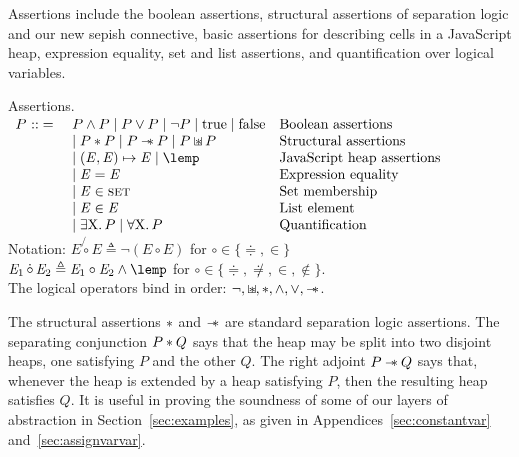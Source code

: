 \documentclass{article}
\newcommand{\iflong}[1]{#1}
\newcommand{\ifshort}[1]{}
\begin{document}
Assertions include the  boolean assertions, structural assertions of separation logic and our new
sepish connective, basic  assertions for describing cells in a JavaScript heap,  expression equality, set and list assertions, and quantification over logical variables.
%
\begin{display}{Assertions.}
$\begin{array}{rll}
  P \defeq 
 & P \land P \pipe P \lor P \pipe \neg P \pipe \true \pipe \false & \text{Boolean assertions}\\
 & \pipe P \sep P \pipe P \wand P \pipe P \sepish P %
                         & \text{Structural assertions} \\
 & \pipe (\Expr,\Expr)\pointsto \Expr \pipe \lemp %
                         & \text{JavaScript heap assertions} \\
 & \pipe \Expr\doteqdot\Expr & \text{Expression equality} \\ %
 & \pipe \Expr \in \T{set} & \text{Set membership} \\
 & \pipe \Expr \elem \Expr  & \text{List element} \\
 & \pipe \exists\V{X}\st P  \pipe \forall\V{X}\st P &  \text{Quantification} \\
\end{array}\Gap$\\[\gap]
Notation: $E\not{\!\circ} E \triangleq \neg(E \circ E)$  for ${\circ}\in\{\doteqdot,\in\}$\\
\phantom{Notation: }$\Expr_1 \dot{\,\circ\,}\Expr_2 \triangleq \Expr_1
\circ \Expr_2 \land \lemp$ for
${\circ}\in\{\doteqdot,\not\doteqdot,\in,\notin\}$.\\
The logical operators bind in order: $\neg,\mathbin{\sqcup\mkern-10mu*},\mathbin{*},\land,\lor,\mathbin{-\mkern-6mu *}$.
\end{display}
%
The structural assertions $\mathbin{*}$ and $\mathbin{-\mkern-6mu *}$ are
standard separation logic assertions. The separating conjunction
$P\mathbin{*} Q$ says that the heap may be split into two disjoint heaps, one
 satisfying  $P$  and the other $Q$. The right adjoint $P \mathbin{-\mkern-6mu *} Q$ says that, whenever the heap is extended by a
heap satisfying $P$, then the resulting heap satisfies $Q$. 
It is useful in
proving the soundness of some of our layers of abstraction in
Section~\ref{sec:examples}, as given in
\ifshort{\cite{proofs}}\iflong{Appendices~\ref{sec:constantvar} and~\ref{sec:assignvarvar}}. 
\end{document}
